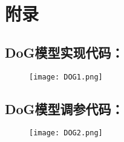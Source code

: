 \documentclass[a4paper,12pt]{article}
\begin{document}
\printbibliography

\newpage
\section{附录}

\subsection{DoG模型实现代码：}
\begin{figure}[htbp]
    \centering
    \texttt{[image: DOG1.png]} 
    
    \label{f0}
\end{figure}
\newpage
\subsection{DoG模型调参代码：}
\begin{figure}[htbp]
    \centering
    \texttt{[image: DOG2.png]} 
   
    \label{f0}
\end{figure}
\end{document}
